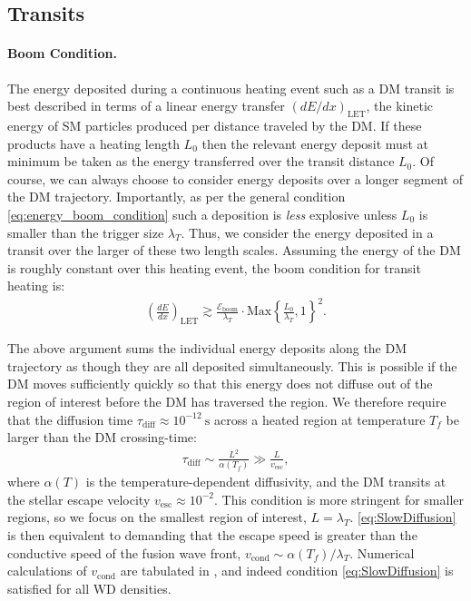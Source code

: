 \documentclass[preprintnumbers,amsmath,amssymb,prd,superscriptaddress]{revtex4}
\newcommand{\Eboom}{\mathcal{E}_\text{boom}}
\begin{document}

\subsection{Transits}

\paragraph{Boom Condition.}
The energy deposited during a continuous heating event such as a DM transit is best described in terms of a linear energy transfer $(dE/dx)_\text{LET}$, the kinetic energy of SM particles produced per distance traveled by the DM.
If these products have a heating length $L_0$ then the relevant energy deposit must at minimum be taken as the energy transferred over the transit distance $L_0$.
Of course, we can always choose to consider energy deposits over a longer segment of the DM trajectory.
Importantly, as per the general condition \eqref{eq:energy_boom_condition} such a deposition is \emph{less} explosive unless $L_0$ is smaller than the trigger size $\lambda_T$.
Thus, we consider the energy deposited in a transit over the larger of these two length scales.
Assuming the energy of the DM is roughly constant over this heating event, the boom condition for transit heating is:
\begin{align}
\label{eq:transitexplosion}
  \left( \frac{d E}{d x} \right)_\text{LET} \gtrsim
  \frac{\Eboom}{\lambda_T} \cdot \text{Max}
  \left\{\frac{L_0}{\lambda_T}, 1 \right\}^2.
\end{align}

The above argument sums the individual energy deposits along the DM trajectory as though they are all deposited simultaneously.
This is possible if the DM moves sufficiently quickly so that this energy does not diffuse out of the region of interest before the DM has traversed the region.
We therefore require that the diffusion time $\tau_\text{diff} \approx 10^{-12} ~\text{s}$ across a heated region at temperature $T_f$ be larger than the DM crossing-time:
\begin{align}
  \tau_\text{diff} \sim \frac{L^2}{\alpha(T_f)} \gg
  \frac{L}{v_\text{esc}},
\label{eq:SlowDiffusion}
\end{align}
where $\alpha(T)$ is the temperature-dependent diffusivity, and the DM transits at the stellar escape velocity $v_\text{esc} \approx 10^{-2}$.
This condition is more stringent for smaller regions, so we focus on the smallest region of interest, $L = \lambda_T$.
\eqref{eq:SlowDiffusion} is then equivalent to demanding that the escape speed is greater than the conductive speed of the fusion wave front, $v_\text{cond} \sim \alpha(T_f) / \lambda_T$.
Numerical calculations of $v_\text{cond}$ are tabulated in \cite{Woosley}, and indeed condition \eqref{eq:SlowDiffusion} is satisfied for all WD densities.
\end{document}
